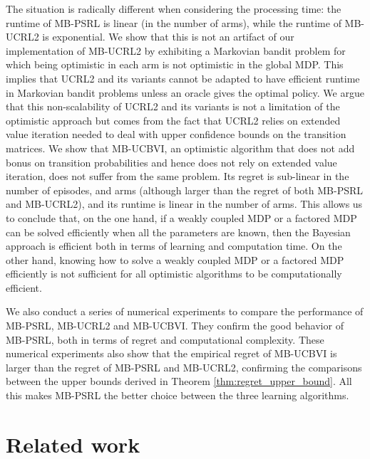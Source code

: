 The situation is radically different when considering the processing time: the runtime of MB-PSRL is linear (in the number of arms), while the runtime of MB-UCRL2 is exponential. We show that this is not an artifact of our implementation of MB-UCRL2 by exhibiting a Markovian bandit problem for which being optimistic in each arm is not optimistic in the global MDP. This implies that UCRL2 and its variants \cite{bourel2020tightening,fruit2018efficient,talebi2018variance,filippi2010optimism} cannot be adapted to have efficient runtime in Markovian bandit problems unless an oracle gives the optimal policy. We argue that this non-scalability of UCRL2 and its variants is not a limitation  of the optimistic approach but comes from the fact that UCRL2 relies on  extended value iteration \cite{jaksch2010near} needed to deal with  upper confidence bounds on the transition matrices.  We show that MB-UCBVI, an optimistic algorithm that does not add bonus on transition probabilities and hence does not rely on extended value iteration,  does not suffer from the same problem. Its  regret is  sub-linear in the number of episodes, and arms (although larger than the regret of both MB-PSRL and MB-UCRL2), and its  runtime is linear in the number of arms.
This allows us to conclude that, on the one hand, if a weakly coupled MDP or a factored MDP can be solved efficiently when all the parameters are known, then the Bayesian approach is efficient both in terms of learning and computation time. On the other hand, knowing how to solve a weakly coupled MDP or a factored MDP efficiently is not sufficient for all optimistic algorithms to be computationally efficient.

We also conduct a series of numerical experiments to compare the performance of MB-PSRL,  MB-UCRL2 and MB-UCBVI.  They confirm the good behavior of MB-PSRL, both in terms of regret and computational complexity. These numerical experiments also show that the empirical regret of MB-UCBVI is larger than the regret of MB-PSRL and MB-UCRL2, confirming the comparisons between the upper bounds derived in Theorem \ref{thm:regret_upper_bound}. All this  makes MB-PSRL the better choice between the three learning algorithms.

\section{Related work}
\label{ch:rested:related}

